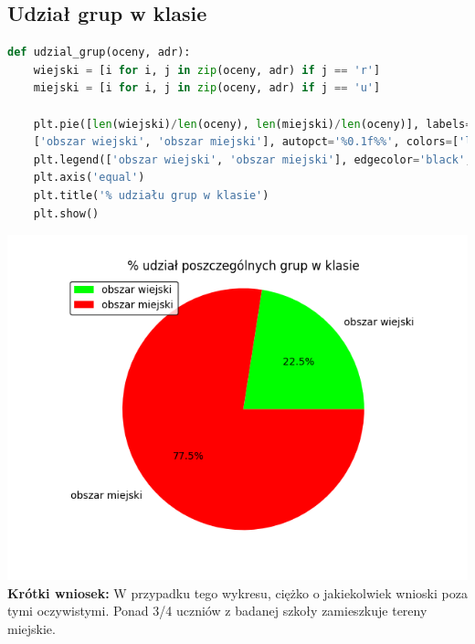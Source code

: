 \documentclass{article}
\begin{document}
\subsection{Udział grup w klasie}
\begin{lstlisting}[language=Python]
def udzial_grup(oceny, adr):
    wiejski = [i for i, j in zip(oceny, adr) if j == 'r']
    miejski = [i for i, j in zip(oceny, adr) if j == 'u']
    
    plt.pie([len(wiejski)/len(oceny), len(miejski)/len(oceny)], labels=
    ['obszar wiejski', 'obszar miejski'], autopct='%0.1f%%', colors=['lime', 'red'])
    plt.legend(['obszar wiejski', 'obszar miejski'], edgecolor='black', loc='upper left')
    plt.axis('equal')
    plt.title('% udziału grup w klasie')
    plt.show()
\end{lstlisting}
\includegraphics[width=\textwidth]{kolowy.png}
\textbf{Krótki wniosek:} W przypadku tego wykresu, ciężko o jakiekolwiek wnioski poza tymi oczywistymi. Ponad 3/4 uczniów z badanej szkoły zamieszkuje tereny miejskie. 
\vspace{15cm}
\end{document}
